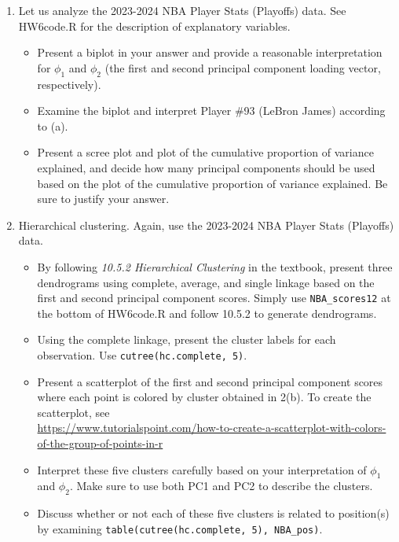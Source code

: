 \documentclass[12pt]{article}
\begin{document}
\begin{enumerate}
\item Let us analyze the 2023-2024 NBA Player Stats (Playoffs) data. See HW6code.R for the description of explanatory variables.
\begin{itemize}
\item[(a)] Present a biplot in your answer and provide a reasonable interpretation for $\phi_1$ and $\phi_2$ (the first and second principal component loading vector, respectively). 
\item[(b)] Examine the biplot and interpret Player \#93 (LeBron James) according to (a). 
\item[(c)] Present a scree plot and plot of the cumulative proportion of variance explained, and decide how many principal components should be used based on the plot of the cumulative proportion of variance explained. Be sure to justify your answer.
\end{itemize}

\item Hierarchical clustering. Again, use the 2023-2024 NBA Player Stats (Playoffs) data.
\begin{itemize}
\item[(a)] By following \textit{10.5.2 Hierarchical Clustering} in the textbook, present three dendrograms using complete, average, and single linkage based on the first and second principal component scores. Simply use {\tt NBA\_scores12} at the bottom of HW6code.R and follow 10.5.2 to generate dendrograms.
\item[(b)] Using the complete linkage, present the cluster labels for each observation. Use {\tt cutree(hc.complete, 5)}.
\item[(c)] Present a scatterplot of the first and second principal component scores where each point is colored by cluster obtained in 2(b). To create the scatterplot, see\\
\tiny
\url{https://www.tutorialspoint.com/how-to-create-a-scatterplot-with-colors-of-the-group-of-points-in-r}
\normalsize
\item[(d)] Interpret these five clusters carefully based on your interpretation of $\phi_1$ and $\phi_2$. Make sure to use both PC1 and PC2 to describe the clusters.
\item[(e)]  Discuss whether or not each of these five clusters is related to position(s) by examining {\tt table(cutree(hc.complete, 5), NBA\_pos)}. 
\end{itemize} 


\end{enumerate}
\end{document}
